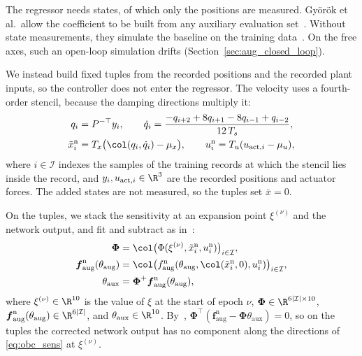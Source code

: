 The regressor needs states, of which only the positions are measured.
Gy\"or\"ok et al.\ allow the coefficient to be built from any auxiliary
evaluation set~\cite[Sec.~3.2]{gyorok2026obc}.
Without state measurements, they simulate the baseline on the training
data~\cite[Sec.~3]{gyorok2025l4dc}.
On the free axes, such an open-loop simulation drifts
(Section~\ref{sec:aug_closed_loop}).

We instead build fixed tuples from the recorded positions and the recorded
plant inputs, so the controller does not enter the regressor.
The velocity uses a fourth-order stencil, because the damping directions
multiply it:
\begin{equation}
\begin{aligned}
 q_i&=P^{-\top}y_i,\qquad
 \dot q_i=\frac{-q_{i+2}+8q_{i+1}-8q_{i-1}+q_{i-2}}{12\,T_s},\\
 \tilde x^{\mathrm n}_i&=T_x\bigl(\col(q_i,\dot q_i)-\mu_x\bigr),\qquad
 u^{\mathrm n}_i=T_u(u_{\mathrm{act},i}-\mu_u),
\end{aligned}
\label{eq:obc_tuples}
\end{equation}
where $i\in\mathcal I$ indexes the samples of the training records at which
the stencil lies inside the record, and $y_i,u_{\mathrm{act},i}\in\R^3$ are
the recorded positions and actuator forces.
The added states are not measured, so the tuples set $\bar x=0$.

On the tuples, we stack the sensitivity at an expansion point
$\xi^{(\nu)}$ and the network output, and fit and subtract as
in~\cite[Eqs.~(8), (10)]{gyorok2026obc}:
\begin{equation}
\begin{aligned}
 \boldsymbol\Phi
 &=\col\bigl(\Phi(\xi^{(\nu)},\tilde x^{\mathrm n}_i,u^{\mathrm n}_i)\bigr)_{i\in\mathcal I},\\
 \boldsymbol f^{\mathrm n}_{\mathrm{aug}}(\theta_{\mathrm{aug}})
 &=\col\bigl(f^{\mathrm n}_{\mathrm{aug}}(\theta_{\mathrm{aug}},
   \col(\tilde x^{\mathrm n}_i,0),u^{\mathrm n}_i)\bigr)_{i\in\mathcal I},\\
 \theta_{\mathrm{aux}}
 &=\boldsymbol\Phi^{+}\boldsymbol f^{\mathrm n}_{\mathrm{aug}}(\theta_{\mathrm{aug}}),
\end{aligned}
\label{eq:obc_coef}
\end{equation}
where $\xi^{(\nu)}\in\R^{10}$ is the value of $\xi$ at the start of epoch
$\nu$, $\boldsymbol\Phi\in\R^{6|\mathcal I|\times10}$,
$\boldsymbol f^{\mathrm n}_{\mathrm{aug}}(\theta_{\mathrm{aug}})\in\R^{6|\mathcal I|}$,
and $\theta_{\mathrm{aux}}\in\R^{10}$.
By~\cite[Lemma~3]{gyorok2026obc},
$\boldsymbol\Phi^\top(\boldsymbol f^{\mathrm n}_{\mathrm{aug}}
-\boldsymbol\Phi\theta_{\mathrm{aux}})=0$, so on the tuples the corrected
network output has no component along the directions of \eqref{eq:obc_sens}
at $\xi^{(\nu)}$.


